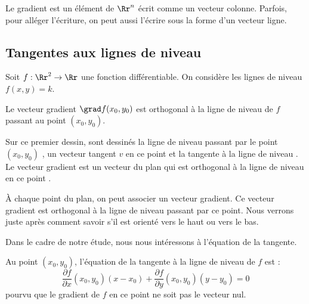 \documentclass[11pt,class=report,crop=false]{standalone}
\begin{document}
\begin{remarque*}
Le gradient est un élément de $\Rr^n$ écrit comme un vecteur colonne. Parfois, pour alléger l'écriture, on peut aussi l'écrire sous la forme d'un vecteur ligne.
\end{remarque*}

\subsection{Tangentes aux lignes de niveau}


Soit $f : \Rr^2 \to \Rr$ une fonction différentiable. On considère les lignes de niveau $f(x,y)=k$.


\begin{proposition}
Le vecteur gradient $\grad f(x_0,y_0)$ est orthogonal à la ligne de niveau de $f$ passant au point $(x_0,y_0)$. 
\end{proposition}


Sur ce premier dessin, sont dessinés la ligne de niveau passant par le point $(x_0,y_0)$ , un vecteur tangent $v$ en ce point et la tangente à la ligne de niveau . 
Le vecteur gradient est un vecteur du plan qui est orthogonal à la ligne de niveau en ce point .


\bigskip


À chaque point du plan, on peut associer un vecteur gradient. Ce vecteur gradient est orthogonal à la ligne de niveau passant par ce point. Nous verrons juste après comment savoir s'il est orienté \og{}vers le haut\fg{} ou \og{}vers le bas\fg{}. 


Dans le cadre de notre étude, nous nous intéressons à l'équation de la tangente.
\begin{proposition}
Au point $(x_0,y_0)$, l'équation de la tangente à la ligne de niveau de $f$ est :
$$\frac{\partial f}{\partial x}(x_0,y_0)(x-x_0)+\frac{\partial f}{\partial y}(x_0,y_0)(y-y_0)=0$$
pourvu que le gradient de $f$ en ce point ne soit pas le vecteur nul.
\end{proposition}
\end{document}
